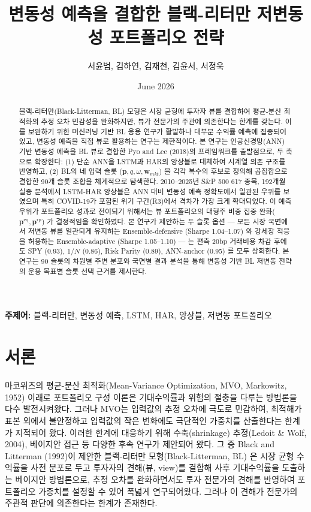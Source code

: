 \documentclass{article}
\title{변동성 예측을 결합한 블랙-리터만 저변동성 포트폴리오 전략}
\author{서윤범, 김하연, 김재천, 김윤서, 서정욱}
\date{June 2026}
\begin{document}
\maketitle

\begin{abstract}
    블랙-리터만(Black-Litterman, BL) 모형은 시장 균형에 투자자 뷰를 결합하여 평균-분산 최적화의 추정 오차 민감성을 완화하지만, 뷰가 전문가의 주관에 의존한다는 한계를 갖는다. 이를 보완하기 위한 머신러닝 기반 BL 응용 연구가 활발하나 대부분 수익률 예측에 집중되어 있고, 변동성 예측을 직접 뷰로 활용하는 연구는 제한적이다. 본 연구는 인공신경망(ANN) 기반 변동성 예측을 BL 뷰로 결합한 Pyo and Lee (2018)의 프레임워크를 출발점으로, 두 축으로 확장한다: (1) 단순 ANN을 LSTM과 HAR의 앙상블로 대체하여 시계열 의존 구조를 반영하고, (2) BL의 네 입력 슬롯 ($\mathbf{p}, q, \omega, \mathbf{w}_{mkt}$) 을 각각 복수의 후보로 정의해 곱집합으로 결합한 90개 슬롯 조합을 체계적으로 탐색한다. 2010–2025년 S\&P 500 617 종목, 192개월 실증 분석에서 LSTM-HAR 앙상블은 ANN 대비 변동성 예측 정확도에서 일관된 우위를 보였으며 특히 COVID-19가 포함된 위기 구간(R3)에서 격차가 가장 크게 확대되었다. 이 예측 우위가 포트폴리오 성과로 전이되기 위해서는 뷰 포트폴리오의 대형주 비중 집중 완화($\mathbf{p}^{\mathrm{eq}}, \mathbf{p}^{\mathrm{rp}}$) 가 결정적임을 확인하였다. 본 연구가 제안하는 두 슬롯 옵션 — 모든 시장 국면에서 저변동 뷰를 일관되게 유지하는 Ensemble-defensive (Sharpe 1.04–1.07) 와 강세장 적응을 허용하는 Ensemble-adaptive (Sharpe 1.05–1.10) — 는 편측 20bp 거래비용 차감 후에도 SPY (0.93), $1/N$ (0.86), Risk Parity (0.89), ANN-anchor (0.95) 를 모두 상회한다. 본 연구는 90 슬롯의 차원별 주변 분포와 국면별 결과 분석을 통해 변동성 기반 BL 저변동 전략의 운용 목표별 슬롯 선택 근거를 제시한다.
\end{abstract}

\noindent\textbf{주제어:} 블랙-리터만, 변동성 예측, LSTM, HAR, 앙상블, 저변동 포트폴리오

\section{서론}

마코위츠의 평균-분산 최적화(Mean-Variance Optimization, MVO, Markowitz, 1952) 이래로 포트폴리오 구성 이론은 기대수익률과 위험의 절충을 다루는 방법론을 다수 발전시켜왔다. 그러나 MVO는 입력값의 추정 오차에 극도로 민감하여, 최적해가 표본 외에서 불안정하고 입력값의 작은 변화에도 극단적인 가중치를 산출한다는 한계가 지적되어 왔다. 이러한 한계에 대응하기 위해 수축(shrinkage) 추정(Ledoit & Wolf, 2004), 베이지안 접근 등 다양한 후속 연구가 제안되어 왔다. 그 중 Black and Litterman (1992)이 제안한 블랙-리터만 모형(Black-Litterman, BL) 은 시장 균형 수익률을 사전 분포로 두고 투자자의 견해(뷰, view)를 결합해 사후 기대수익률을 도출하는 베이지안 방법론으로, 추정 오차를 완화하면서도 투자 전문가의 견해를 반영하여 포트폴리오 가중치를 설정할 수 있어 폭넓게 연구되어왔다. 그러나 이 견해가 전문가의 주관적 판단에 의존한다는 한계가 존재한다.
\end{document}
